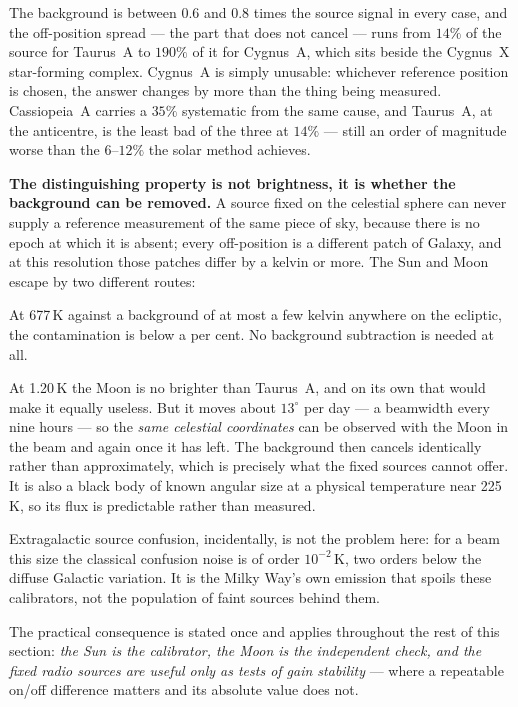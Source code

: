 \documentclass[11pt,a4paper]{article}
\begin{document}
The background is between $0.6$ and $0.8$ times the source signal in every case, and the off-position spread --- the part that does not cancel --- runs from $14\%$ of the source for Taurus~A to $190\%$ of it for Cygnus~A, which sits beside the Cygnus~X star-forming complex. Cygnus~A is simply unusable: whichever reference position is chosen, the answer changes by more than the thing being measured. Cassiopeia~A carries a $35\%$ systematic from the same cause, and Taurus~A, at the anticentre, is the least bad of the three at $14\%$ --- still an order of magnitude worse than the $6$--$12\%$ the solar method achieves.

\textbf{The distinguishing property is not brightness, it is whether the background can be removed.} A source fixed on the celestial sphere can never supply a reference measurement of the same piece of sky, because there is no epoch at which it is absent; every off-position is a different patch of Galaxy, and at this resolution those patches differ by a kelvin or more. The Sun and Moon escape by two different routes:

\begin{description}[style=nextline]
    \item[The Sun escapes by brightness] At 677\,K against a background of at most a few kelvin anywhere on the ecliptic, the contamination is below a per cent. No background subtraction is needed at all.
    \item[The Moon escapes by motion] At 1.20\,K the Moon is no brighter than Taurus~A, and on its own that would make it equally useless. But it moves about $13^\circ$ per day --- a beamwidth every nine hours --- so the \emph{same celestial coordinates} can be observed with the Moon in the beam and again once it has left. The background then cancels identically rather than approximately, which is precisely what the fixed sources cannot offer. It is also a black body of known angular size at a physical temperature near 225\,K, so its flux is predictable rather than measured.
\end{description}

Extragalactic source confusion, incidentally, is not the problem here: for a beam this size the classical confusion noise is of order $10^{-2}$\,K, two orders below the diffuse Galactic variation. It is the Milky Way's own emission that spoils these calibrators, not the population of faint sources behind them.

The practical consequence is stated once and applies throughout the rest of this section: \emph{the Sun is the calibrator, the Moon is the independent check, and the fixed radio sources are useful only as tests of gain stability} --- where a repeatable on/off difference matters and its absolute value does not.
\end{document}
